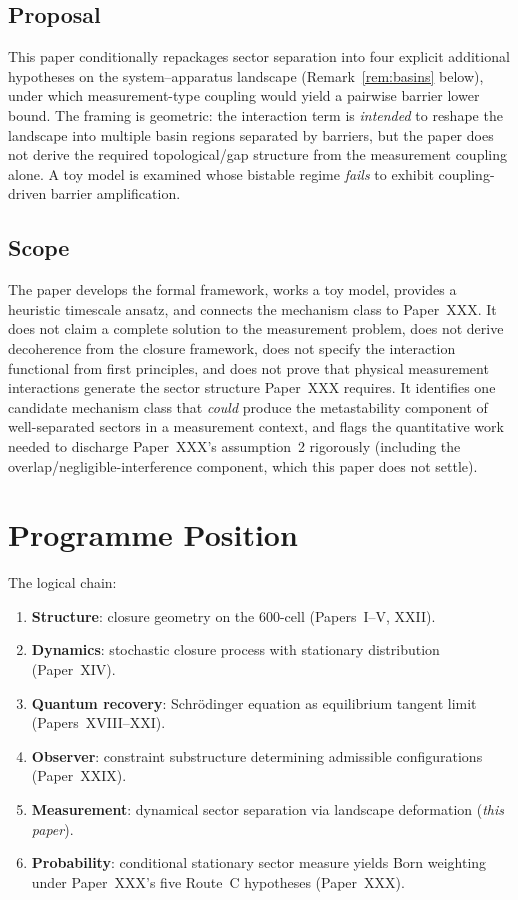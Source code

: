 \documentclass[12pt]{article}
\begin{document}
\subsection*{Proposal}

This paper conditionally repackages sector separation into four explicit additional hypotheses on the system--apparatus landscape (Remark~\ref{rem:basins} below), under which measurement-type coupling would yield a pairwise barrier lower bound. The framing is geometric: the interaction term is \emph{intended} to reshape the landscape into multiple basin regions separated by barriers, but the paper does not derive the required topological/gap structure from the measurement coupling alone. A toy model is examined whose bistable regime \emph{fails} to exhibit coupling-driven barrier amplification.

\subsection*{Scope}

The paper develops the formal framework, works a toy model, provides a heuristic timescale ansatz, and connects the mechanism class to Paper~XXX. It does not claim a complete solution to the measurement problem, does not derive decoherence from the closure framework, does not specify the interaction functional from first principles, and does not prove that physical measurement interactions generate the sector structure Paper~XXX requires. It identifies one candidate mechanism class that \emph{could} produce the metastability component of well-separated sectors in a measurement context, and flags the quantitative work needed to discharge Paper~XXX's assumption~2 rigorously (including the overlap/negligible-interference component, which this paper does not settle).

\section{Programme Position}\label{sec:position}

The logical chain:

\begin{enumerate}
    \item \textbf{Structure}: closure geometry on the 600-cell (Papers~I--V, XXII).
    \item \textbf{Dynamics}: stochastic closure process with stationary distribution (Paper~XIV).
    \item \textbf{Quantum recovery}: Schr\"odinger equation as equilibrium tangent limit (Papers~XVIII--XXI).
    \item \textbf{Observer}: constraint substructure determining admissible configurations (Paper~XXIX).
    \item \textbf{Measurement}: dynamical sector separation via landscape deformation (\textit{this paper}).
    \item \textbf{Probability}: conditional stationary sector measure yields Born weighting under Paper~XXX's five Route~C hypotheses (Paper~XXX).
\end{enumerate}
\end{document}
